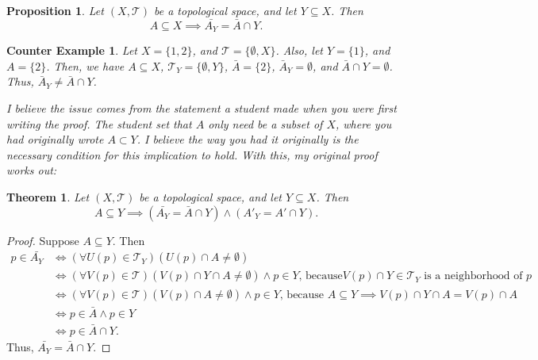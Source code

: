 \documentclass[10pt,a4paper]{article}
\author{Jeremiah Givens}
\theoremstyle{theorem}
\newtheorem{theorem}{Theorem}
\newtheorem{prop}{Proposition}
\newtheorem{CA}{Counter Example}
\theoremstyle{definition}
\newcommand{\Tau}{\mathcal{T}}
\begin{document}
\begin{prop}
Let $(X, \Tau)$ be a topological space, and let $Y \subseteq X$. Then 
\begin{equation*}
A \subseteq X \implies \bar{A_Y} = \bar{A} \cap Y.
\end{equation*}
\end{prop}

\begin{CA}
Let $X = \{1, 2\}$, and $\Tau = \{\emptyset, X\}$. Also, let $Y = \{1\}$, and $A = \{2\}$. Then,  we have $A \subseteq X$,  $\Tau_Y = \{\emptyset, Y\}$, $\bar{A} = \{2\}$, $\bar{A}_Y = \emptyset$, and $\bar{A} \cap Y = \emptyset$. Thus, $\bar{A}_Y \not = \bar{A} \cap Y$.

I believe the issue comes from the statement a student made when you were first writing the proof. The student set that $A$ only need be a subset of $X$, where you had originally wrote $A \subset Y$. I believe the way you had it originally is the necessary condition for this implication to hold. With this, my original proof works out:
\end{CA}

\begin{theorem}
Let $(X, \Tau)$ be a topological space, and let $Y \subseteq X$. Then 
\begin{equation*}
A \subseteq Y \implies (\bar{A_Y} = \bar{A} \cap Y) \land (A'_Y = A' \cap Y).
\end{equation*}
\end{theorem}

\begin{proof}
Suppose $A \subseteq Y$.  Then 
\begin{align*}
p \in \bar{A_Y} &\iff (\forall U(p) \in \Tau_Y)(U(p) \cap A \not = \emptyset)\\
&\iff (\forall V(p) \in \Tau)(V(p) \cap Y \cap A \not = \emptyset) \land p \in Y\text{,  because} V(p) \cap Y \in \Tau_Y \text{ is a neighborhood of } p\\
&\iff (\forall V(p) \in \Tau)(V(p) \cap A \not = \emptyset) \land p \in Y\text{,  because } A \subseteq Y \implies V(p) \cap Y \cap A = V(p) \cap A\\
&\iff p \in \bar{A} \land p \in Y\\
&\iff p \in \bar{A} \cap Y.
\end{align*}
Thus,  $\bar{A_Y} = \bar{A} \cap Y$.  
\end{proof}
\end{document}
